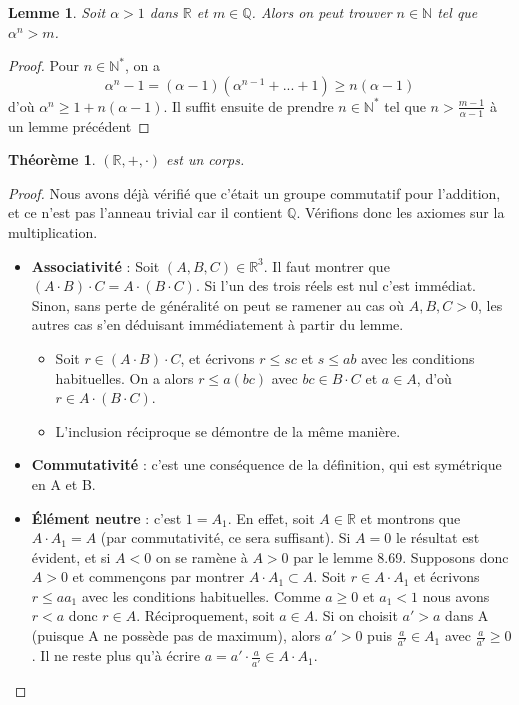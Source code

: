 \documentclass[french]{book}
\theoremstyle{plain}
\newtheorem{thm}{Théorème}[chapter]
\newtheorem{lem}{Lemme}[chapter]
\theoremstyle{definition}
\theoremstyle{remark}
\begin{document}
\begin{lem}
	Soit $\alpha > 1$ dans $\mathbb{R}$ et $m \in \mathbb{Q}$. Alors on peut trouver $n \in \mathbb{N}$ tel que $\alpha^n > m$.
\end{lem}
\begin{proof}
	Pour $n \in \mathbb{N}^*$, on a $$\alpha^n - 1 = (\alpha - 1)(\alpha^{n-1} + ... + 1) \geqslant n(\alpha - 1)$$ d'où $\alpha^n \geqslant 1 + n(\alpha - 1)$. Il suffit ensuite de prendre $n \in \mathbb{N}^*$ tel que $\displaystyle n > \frac{m - 1}{\alpha - 1}$ à un lemme précédent
\end{proof}
\begin{thm}
	$(\mathbb{R}, +, \cdot)$ est un corps.
\end{thm}
\begin{proof}
	Nous avons déjà vérifié que c'était un groupe commutatif pour l'addition, et ce n'est pas l'anneau trivial car il contient $\mathbb{Q}$. Vérifions donc les axiomes sur la multiplication.
	\begin{itemize}
		\item \textbf{Associativité} : Soit $(A,B,C) \in \mathbb{R}^3$. Il faut montrer que $(A \cdot B) \cdot C = A \cdot (B \cdot C)$. Si l'un des trois réels est nul c'est immédiat. Sinon, sans perte de généralité on peut se ramener au cas où $A,B,C>0$, les autres cas s'en déduisant immédiatement à partir du lemme.
		\begin{itemize}
			\item[--]Soit $r \in (A \cdot B) \cdot C$, et écrivons $r \leqslant sc$ et $s \leqslant ab$ avec les conditions habituelles.
			On a alors $r \leqslant a(bc)$ avec $bc \in B \cdot C$ et $a \in A$, d'où $r \in A \cdot (B \cdot C)$.
			\item[--]L'inclusion réciproque se démontre de la même manière.
		\end{itemize}
		\item \textbf{Commutativité} : c'est une conséquence de la définition, qui est symétrique en A et B.
		\item \textbf{Élément neutre} : c'est $1 = A_1$. En effet, soit $A \in \mathbb{R}$ et montrons que $A \cdot A_1 = A$ (par commutativité, ce sera suffisant). Si $A = 0$ le résultat est évident, et si $A < 0$ on se ramène à $A > 0$ par le lemme 8.69. Supposons donc $A > 0$ et commençons par montrer $A \cdot A_1 \subset A$. Soit $r \in A \cdot A_1$ et écrivons $r \leqslant aa_1$ avec les conditions habituelles. Comme $a \geqslant 0$ et $a_1 < 1$ nous avons $r < a$ donc $r \in A$. Réciproquement, soit $a \in A$. Si on choisit $a' > a$ dans A (puisque A ne possède pas de maximum), alors $a'>0$ puis $\displaystyle\frac{a}{a'} \in A_1$ avec $\displaystyle\frac{a}{a'} \geqslant 0$. Il ne reste plus qu'à écrire $a = a' \cdot \frac{a}{a'} \in A \cdot A_1$.

\end{itemize}
\end{proof}
\end{document}
